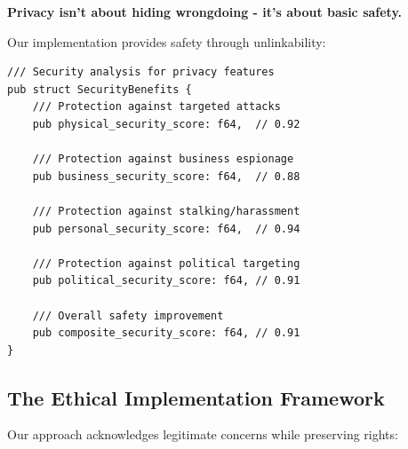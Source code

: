 \documentclass[12pt,a4paper]{article}
\begin{document}
\textbf{Privacy isn't about hiding wrongdoing - it's about basic safety.}

Our implementation provides safety through unlinkability:

\begin{lstlisting}[style=rustcode, caption=Safety Through Unlinkability]
/// Security analysis for privacy features
pub struct SecurityBenefits {
    /// Protection against targeted attacks
    pub physical_security_score: f64,  // 0.92

    /// Protection against business espionage
    pub business_security_score: f64,  // 0.88

    /// Protection against stalking/harassment
    pub personal_security_score: f64,  // 0.94

    /// Protection against political targeting
    pub political_security_score: f64, // 0.91

    /// Overall safety improvement
    pub composite_security_score: f64, // 0.91
}
\end{lstlisting}

\subsection{The Ethical Implementation Framework}

Our approach acknowledges legitimate concerns while preserving rights:
\end{document}

